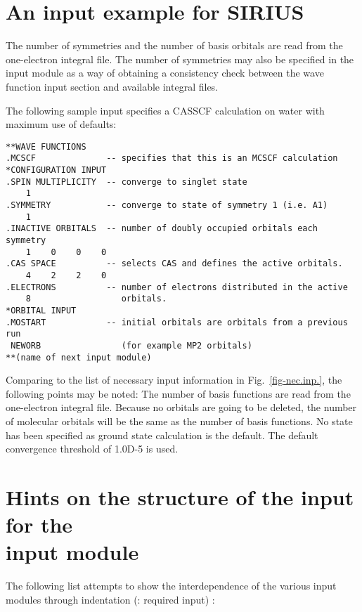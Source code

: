 \section{\label{sec:si-ex} An input example for SIRIUS}

\noindent
The number of symmetries and the number of basis orbitals are read from
the one-electron integral file.  The number of symmetries may also be
specified in the  input module as a way of
obtaining a consistency check between the wave function input section
and available integral files.

\noindent
The following sample input specifies a CASSCF
calculation on water with maximum use of defaults:

\begin{verbatim}
**WAVE FUNCTIONS
.MCSCF              -- specifies that this is an MCSCF calculation
*CONFIGURATION INPUT
.SPIN MULTIPLICITY  -- converge to singlet state
    1
.SYMMETRY           -- converge to state of symmetry 1 (i.e. A1)
    1
.INACTIVE ORBITALS  -- number of doubly occupied orbitals each symmetry
    1    0    0    0
.CAS SPACE          -- selects CAS and defines the active orbitals.
    4    2    2    0
.ELECTRONS          -- number of electrons distributed in the active
    8                  orbitals.
*ORBITAL INPUT
.MOSTART            -- initial orbitals are orbitals from a previous run
 NEWORB                (for example MP2 orbitals)
**(name of next input module)
\end{verbatim}

\noindent
Comparing to the list of necessary input information in
Fig.~\ref{fig-nec.inp.},
the following points may be noted:
\noindent
The number of basis functions are read from the one-electron integral
file. Because no orbitals are going to be deleted, the number of
molecular orbitals will be the same as the number of basis functions.
\noindent
No state has been specified as ground state calculation is the default.
\noindent
The default convergence threshold of
1.0D-5 is used.


\clearpage
\section{\label{sec:ig_hints} Hints on the structure of the input for
the \\ input module}


The following list attempts to show the interdependence of the various
input modules through indentation
(: required input) :

